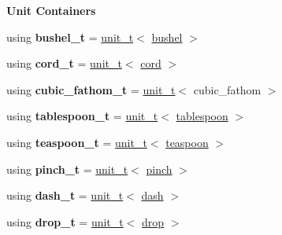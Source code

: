\begin{Indent}{\bf Unit Containers}
\begin{DoxyCompactItemize}
\item 
\hypertarget{namespaceunits_1_1volume_a351999b5e88bffc20085423bc9f98277}{}using {\bfseries bushel\+\_\+t} = \hyperlink{classunits_1_1unit__t}{unit\+\_\+t}$<$ \hyperlink{structunits_1_1unit}{bushel} $>$\label{namespaceunits_1_1volume_a351999b5e88bffc20085423bc9f98277}

\item 
\hypertarget{namespaceunits_1_1volume_a2ef5ad7c7eb965ee51450bec651e7ed9}{}using {\bfseries cord\+\_\+t} = \hyperlink{classunits_1_1unit__t}{unit\+\_\+t}$<$ \hyperlink{structunits_1_1unit}{cord} $>$\label{namespaceunits_1_1volume_a2ef5ad7c7eb965ee51450bec651e7ed9}

\item 
\hypertarget{namespaceunits_1_1volume_a2d284b430336e6480df4631c3d923976}{}using {\bfseries cubic\+\_\+fathom\+\_\+t} = \hyperlink{classunits_1_1unit__t}{unit\+\_\+t}$<$ cubic\+\_\+fathom $>$\label{namespaceunits_1_1volume_a2d284b430336e6480df4631c3d923976}

\item 
\hypertarget{namespaceunits_1_1volume_adba130d2187e7dbc4a17250e1a668c8e}{}using {\bfseries tablespoon\+\_\+t} = \hyperlink{classunits_1_1unit__t}{unit\+\_\+t}$<$ \hyperlink{structunits_1_1unit}{tablespoon} $>$\label{namespaceunits_1_1volume_adba130d2187e7dbc4a17250e1a668c8e}

\item 
\hypertarget{namespaceunits_1_1volume_a6d0fc876d38e2ba7ccc07039c48d0f9c}{}using {\bfseries teaspoon\+\_\+t} = \hyperlink{classunits_1_1unit__t}{unit\+\_\+t}$<$ \hyperlink{structunits_1_1unit}{teaspoon} $>$\label{namespaceunits_1_1volume_a6d0fc876d38e2ba7ccc07039c48d0f9c}

\item 
\hypertarget{namespaceunits_1_1volume_ac1594b0c588e4f824cf38c37cae311d5}{}using {\bfseries pinch\+\_\+t} = \hyperlink{classunits_1_1unit__t}{unit\+\_\+t}$<$ \hyperlink{structunits_1_1unit}{pinch} $>$\label{namespaceunits_1_1volume_ac1594b0c588e4f824cf38c37cae311d5}

\item 
\hypertarget{namespaceunits_1_1volume_a5ba6b604073a12e601cc00599f4b53e3}{}using {\bfseries dash\+\_\+t} = \hyperlink{classunits_1_1unit__t}{unit\+\_\+t}$<$ \hyperlink{structunits_1_1unit}{dash} $>$\label{namespaceunits_1_1volume_a5ba6b604073a12e601cc00599f4b53e3}

\item 
\hypertarget{namespaceunits_1_1volume_a4b7d257f389c92035733be294932166c}{}using {\bfseries drop\+\_\+t} = \hyperlink{classunits_1_1unit__t}{unit\+\_\+t}$<$ \hyperlink{structunits_1_1unit}{drop} $>$\label{namespaceunits_1_1volume_a4b7d257f389c92035733be294932166c}


\end{DoxyCompactItemize}
\end{Indent}
